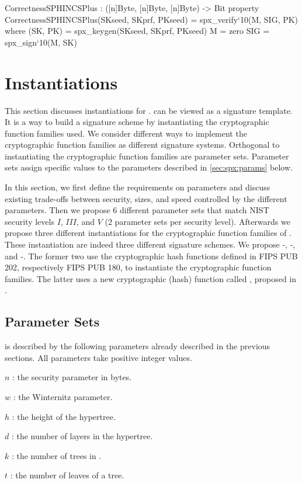 \begin{code}
  CorrectnessSPHINCSPlus : ([n]Byte, [n]Byte, [n]Byte) -> Bit
  property CorrectnessSPHINCSPlus(SKseed, SKprf, PKseed) = spx_verify`{10}(M, SIG, PK)
    where
      (SK, PK) = spx_keygen(SKseed, SKprf, PKseed)
      M = zero
      SIG = spx_sign`{10}(M, SK)
\end{code}

\section{Instantiations}
\label{sec:instantiations}

This section discusses instantiations for \spx. \spx can be
viewed as a signature template. It is a way to build a signature
scheme by instantiating the cryptographic function families used. We consider
different ways to implement the cryptographic function families as
different signature systems. Orthogonal to instantiating the cryptographic
function families are parameter sets. Parameter sets
assign  specific values to the \spx parameters described in \autoref{sec:spx:params} below.

In this section, we first define the requirements on parameters and discuss
existing trade-offs between
security, sizes, and speed controlled by the different parameters. Then we
propose 6 different parameter sets that match NIST security levels $I$,
$III$, and $V$ (2 parameter sets per security level). Afterwards we propose
three different instantiations for the cryptographic function families of \spx.
These instantiation are indeed three different signature schemes. We propose
\spx-\shathree, \spx-\shatwo, and \spx-\haraka. The
former two use the cryptographic hash functions defined in FIPS PUB 202,
respectively FIPS PUB 180, to instantiate the cryptographic function families.
The latter uses a new cryptographic (hash) function called \haraka, proposed in
\cite{articleToSC563}.

\subsection{\spx Parameter Sets}\label{sec:spx:params}
\spx is described by the following parameters already described in the previous
sections. All parameters take positive integer values.
\begin{description}
 \item  $n$ : the security parameter in bytes.
 \item  $w$ : the Winternitz parameter.
 \item  $h$ : the height of the hypertree.
 \item  $d$ : the number of layers in the hypertree.
 \item  $k$ : the number of trees in \fors.
 \item  $t$ : the number of leaves of a \fors tree.
\end{description}

